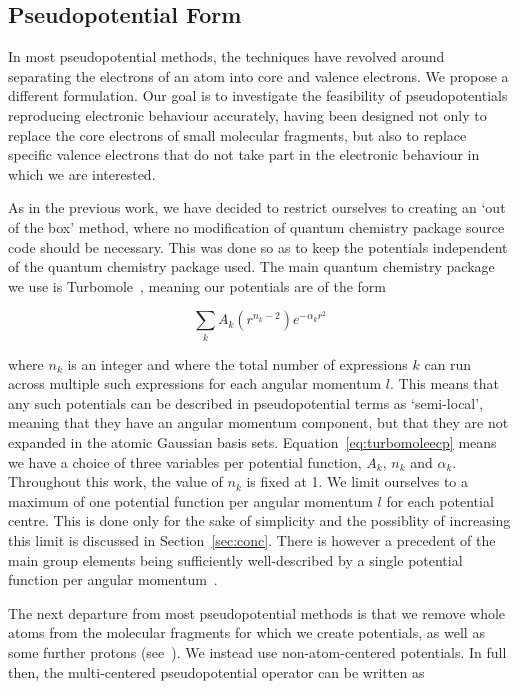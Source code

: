 \documentclass[aip,reprint,nofootinbib]{revtex4-1}
\begin{document}
\subsection{Pseudopotential Form}
\label{sec:pseudoform}

In most pseudopotential methods, the techniques have revolved around separating the electrons of an atom into core and valence electrons. We propose a different formulation. Our goal is to investigate the feasibility of pseudopotentials reproducing electronic behaviour accurately, having been designed not only to replace the core electrons of small molecular fragments, but also to replace specific valence electrons that do not take part in the electronic behaviour in which we are interested.

As in the previous work, we have decided to restrict ourselves to creating an `out of the box' method, where no modification of quantum chemistry package source code should be necessary. This was done so as to keep the potentials independent of the quantum chemistry package used. The main quantum chemistry package we use is Turbomole~\cite{TURBOMOLE}, meaning our potentials are of the form

\begin{equation}
\sum_{k}{A_k(r^{n_{k}-2})e^{-\alpha_{k}r^{2}}}
\label{eq:turbomoleecp}
\end{equation}

where $n_k$ is an integer and where the total number of expressions $k$ can run across multiple such expressions for each angular momentum $l$. This means that any such potentials can be described in pseudopotential terms as `semi-local', meaning that they have an angular momentum component, but that they are not expanded in the atomic Gaussian basis sets. Equation~\ref{eq:turbomoleecp} means we have a choice of three variables per potential function, $A_k$, $n_k$ and $\alpha_k$. Throughout this work, the value of $n_k$ is fixed at 1. We limit ourselves to a maximum of one potential function per angular momentum $l$ for each potential centre. This is done only for the sake of simplicity and the possiblity of increasing this limit is discussed in Section~\ref{sec:conc}. There is however a precedent of the main group elements being sufficiently well-described by a single potential function per angular momentum~\cite{igelmann_1988}.

The next departure from most pseudopotential methods is that we remove whole atoms from the molecular fragments for which we create potentials, as well as some further protons (see~\cite{punter2019atomic}). We instead use non-atom-centered potentials. In full then, the multi-centered pseudopotential operator can be written as
\end{document}
